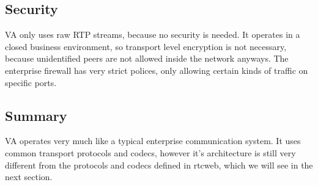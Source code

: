 \subsection{Security}
VA only uses raw RTP streams, because no security is needed. It operates in a closed business environment, so transport level encryption is not necessary, because unidentified peers are not allowed inside the network anyways. The enterprise firewall has very strict polices, only allowing certain kinds of traffic on specific ports.

\subsection*{Summary}
VA operates very much like a typical enterprise communication system. It uses common transport protocols and codecs, however it's architecture is still very different from the protocols and codecs defined in \gls{rtcweb}, which we will see in the next section.